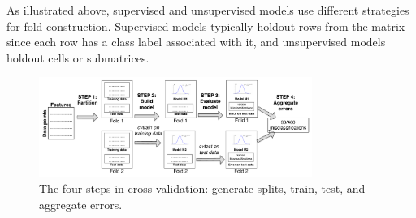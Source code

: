 \documentclass{vldb}
\begin{document}
As illustrated above, supervised and unsupervised models use different
strategies for fold construction. Supervised models typically
holdout rows from the matrix since each row has a class label associated with
it, and unsupervised models holdout cells or submatrices.

\begin{figure}
\centering
\includegraphics[width=3.5in]{illustration.pdf}
\caption{The four steps in cross-validation: generate splits, train, test, and aggregate errors.}
\label{fig:illustration}
\end{figure}
\end{document}
